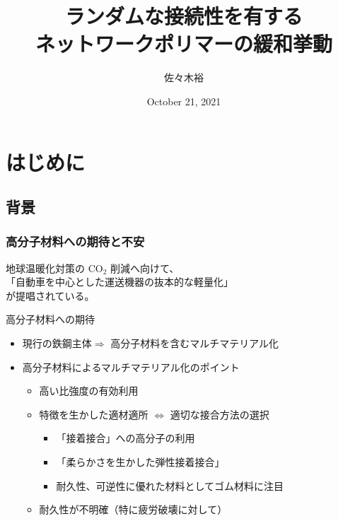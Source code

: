 \documentclass[12pt, dvipdfmx]{beamer}
\title
[ランダムな接続性を有するネットワークポリマーの緩和挙動]
{ランダムな接続性を有する\\ネットワークポリマーの緩和挙動}
\author[東亞合成　佐々木]{佐々木裕}
\institute[東亞合成]{東亞合成}
\date{October 21, 2021}
\begin{document}
\begin{frame}\frametitle{}
	\titlepage
\end{frame}

\section{はじめに}
\subsection{背景}

\begin{frame}
	\frametitle{高分子材料への期待と不安}
	地球温暖化対策の CO$_2$ 削減へ向けて、\\
	{\color{red}「自動車を中心とした運送機器の抜本的な軽量化」}
	\\
	が提唱されている。
	\begin{block}{高分子材料への期待}
		\begin{itemize}
			\item 現行の鉄鋼主体$ \Rightarrow$ 高分子材料を含むマルチマテリアル化
			\item 高分子材料によるマルチマテリアル化のポイント
				\begin{itemize}
					\item 高い比強度の有効利用
					\item 特徴を生かした適材適所 $\Leftrightarrow$ 適切な接合方法の選択
						\begin{itemize}
							\item {\color{red} 「接着接合」への高分子の利用}
							\item {\color{red} 「柔らかさを生かした弾性接着接合」}
							\item 耐久性、可逆性に優れた材料としてゴム材料に注目
						\end{itemize}
					\item {\color{blue}耐久性が不明確（特に疲労破壊に対して）}
				\end{itemize}
		\end{itemize}
	\end{block}
\end{frame}
\end{document}
